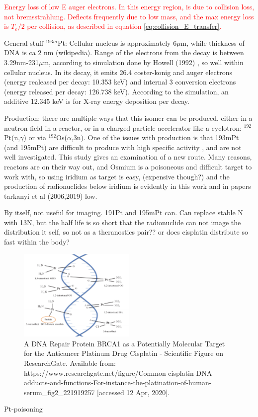 \textcolor{red}{Energy loss of low E auger electrons. In this energy region, is due to collision loss, not bremsstrahlung. Deflects frequently due to low mass, and the max energy loss is $T_e/2$ per collision, as described in equation \ref{eq:collision_E_transfer}. }

\newline
General stuff $^{193m}$Pt: Cellular nucleus is approximately 6$\mu$m, while thickness of DNA is ca 2 nm (wikipedia). Range of the electrons from the decay is between 3.29nm-231$\mu$m, according to simulation done by Howell (1992) \cite{Howell1992}, so well within cellular nucleus. In its decay, it emits 26.4 coster-konig and auger electrons (energy realeased per decay: 10.353 keV) and internal 3 conversion electrons (energy released per decay: 126.738 keV). According to the simulation, an additive 12.345 keV is for X-ray energy deposition per decay. 

Production: there are multiple ways that this isomer can be produced, either in a neutron field in a reactor, or in a charged particle accelerator like a cyclotron: $^{192}$Pt(n,$\gamma$) or via $^{192}$Os($\alpha$,3n). One of the issues with production is that 193mPt (and 195mPt) are difficult to produce with high specific activity \cite{Qaim2017c}, and are not well investigated. This study gives an examination of a new route. Many reasons, reactors are on their way out, and Osmium is a poisoneous and difficult target to work with, so using iridium as target is easy, (expensive though?) and the production of radionuclides below iridium is evidently in this work and in papers tarkanyi et al (2006,2019) low. 

By itself, not useful for imaging. 191Pt and 195mPt can. Can replace stable N with 13N, but the half life is so short that the radionuclide can not image the distribution it self, so not as a theranostics pair?? or does cisplatin distribute so fast within the body? 



\begin{figure}
    \centering
    \includegraphics[width=0.5\textwidth]{Theory/cisplatin_DNA.png}
    \caption{A DNA Repair Protein BRCA1 as a Potentially Molecular Target for the Anticancer Platinum Drug Cisplatin - Scientific Figure on ResearchGate. Available from: https://www.researchgate.net/figure/Common-cisplatin-DNA-adducts-and-functions-For-instance-the-platination-of-human-serum_fig2_221919257 [accessed 12 Apr, 2020]. }
    \label{fig:cisplatin_DNA}
\end{figure}
Pt-poisoning 




